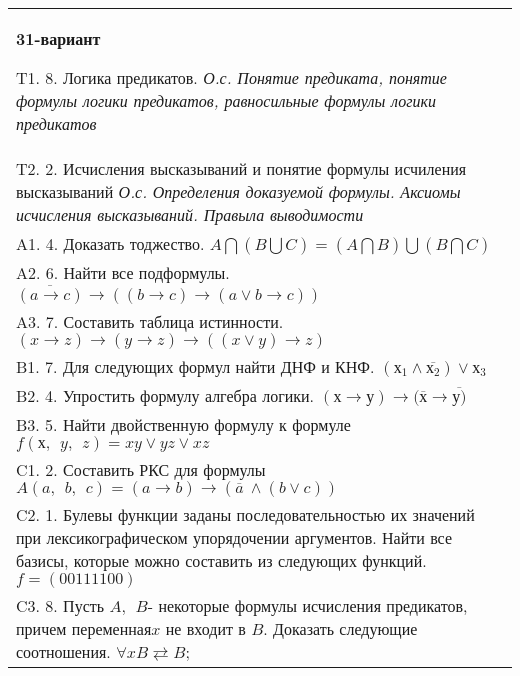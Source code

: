 \documentclass{article}
\begin{document}
\begin{tabular}{m{17cm}}
\textbf{31-вариант}
\newline

T1. 8. Логика предикатов. \emph{О.с. Понятие предиката, понятие формулы логики предикатов, равносильные формулы логики предикатов} \\
T2. 2. Исчисления высказываний и понятие формулы исчиления высказываний \emph{О.с. Определения доказуемой формулы. Аксиомы исчисления высказываний. Правыла выводимости} \\
A1. 4. Доказать тоджество. \(A\bigcap(B\bigcup C) = (A\bigcap B)\bigcup(B\bigcap C)\) \\
A2. 6. Найти все подформулы. \(\overline{(a \rightarrow c)} \rightarrow \left( (b \rightarrow c) \rightarrow (a \vee b \rightarrow c) \right)\) \\
A3. 7. Составить таблица истинности. \((x \rightarrow z) \rightarrow (y \rightarrow z) \rightarrow ((x \vee y) \rightarrow z)\) \\
B1. 7. Для следующих формул найти ДНФ и КНФ. \(\left( х_{1} \land \overline{х_{2}} \right) \vee х_{3}\) \\
B2. 4. Упростить формулу алгебра логики. \((х \rightarrow у) \rightarrow (\overline{х} \rightarrow \overline{у)}\) \\
B3. 5. Найти двойственную формулу к формуле \(f(х,\ \ y,\ \ z) = xy \vee yz \vee xz\) \\
C1. 2. Составить РКС для формулы \(A(a,\ \ b,\ \ c) = (a \rightarrow b) \rightarrow (\overline{a}\  \land (b \vee c))\) \\
C2. 1. Булевы функции заданы последовательностью их значений при лексикографическом упорядочении аргументов. Найти все базисы, которые можно составить из следующих функций.\(f = (00111100)\) \\
C3. 8. Пусть \(A,\ \ B\)- некоторые формулы исчисления предикатов, причем переменная\(x\) не входит в \(B\). Доказать следующие соотношения. \(\forall xB \rightleftarrows B\); \\

\end{tabular}
\vspace{1cm}
\end{document}

